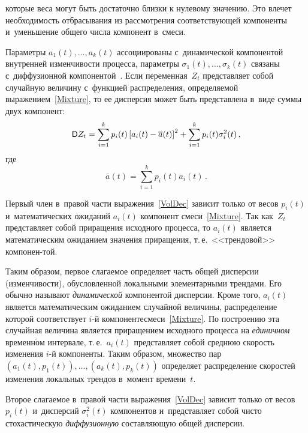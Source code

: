 \begin{multicols}{2}

\noindent
которые веса
могут быть достаточно близки к нулевому значению. Это влечет
необходимость отбрасывания из рассмотрения соответствующей
компоненты и~уменьшение общего числа компонент в~смеси.

Параметры $a_{1}(t),\ldots,a_{k}(t)$ ассоциированы с~динамической
компонентой внутренней изменчи\-вости процесса, параметры
$\sigma_{1}(t),\ldots,\sigma_{k}(t)$  связаны с~диффузионной
компонентой~\cite{Korolev2011}. Если переменная~$Z_t$ представляет
собой случайную величину с~функцией распределения, определяемой
выражением~\eqref{Mixture}, то ее дисперсия может быть
представлена в~виде суммы двух компонент:
\begin{equation}
\label{VolDec}
{\sf D}Z_t=\sum\limits_{i=1}^{k}p_i(t)\left[a_i(t)-\overline
a(t)\right]^2+\sum\limits_{i=1}^{k}p_i(t)\sigma_i^2(t)\,,
\end{equation}
где
\begin{equation*}
\overline a(t)=\sum\limits_{i=1}^{k}p_i(t)a_i(t)\,.
\end{equation*}

Первый член в~правой части выражения~\eqref{VolDec} зависит только
от весов $p_i(t)$ и~математических ожиданий $a_i(t)$ компонент
смеси~\eqref{Mixture}. Так как~$Z_t$ представляет собой приращения
исходного процесса, то $a_i(t)$ является математическим ожиданием
значения приращения, т.\,е.\ <<трендовой>> компонен-\linebreak той. 

Таким
образом, первое слагаемое определяет часть общей дисперсии
(изменчивости), обуслов\-лен\-ной локальными элементарными
трендами. Его обычно называют \textit{динамической} компонентой
дисперсии. Кроме того, $a_i(t)$ является математическим ожиданием
случайной величины, распределение которой %
соответствует $i$-й
компоненте\linebreak смеси~\eqref{Mixture}. По построению эта случайная
величина является приращением исходного процесса на {\it
единичном} временн$\acute{\mbox{о}}$м интервале, т.\,е.\ $a_i(t)$ представляет
собой среднюю  скорость изменения  \mbox{$i$-й} компоненты.
%
 Таким
образом, множество пар $(a_1(t),p_1(t)),\ldots,(a_k(t),p_k(t))$
определяет распределение скоростей изменения локальных трендов
в~момент времени~$t$.
{ %

}

Второе слагаемое в~правой части выражения~\eqref{VolDec} зависит
только от весов $p_i(t)$ и~дисперсий $\sigma_i^2(t)$ компонентов 
и~представляет собой чисто стохастическую \textit{диффузионную}
составляющую общей дис\-персии.


\end{multicols}
